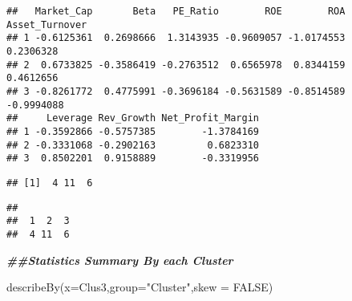 \documentclass[
]{article}
\newenvironment{Shaded}{\begin{snugshade}}{\end{snugshade}}
\newcommand{\AttributeTok}[1]{\textcolor[rgb]{0.77,0.63,0.00}{#1}}
\newcommand{\ConstantTok}[1]{\textcolor[rgb]{0.00,0.00,0.00}{#1}}
\newcommand{\DocumentationTok}[1]{\textcolor[rgb]{0.56,0.35,0.01}{\textbf{\textit{#1}}}}
\newcommand{\FunctionTok}[1]{\textcolor[rgb]{0.00,0.00,0.00}{#1}}
\newcommand{\NormalTok}[1]{#1}
\newcommand{\SpecialCharTok}[1]{\textcolor[rgb]{0.00,0.00,0.00}{#1}}
\newcommand{\StringTok}[1]{\textcolor[rgb]{0.31,0.60,0.02}{#1}}
\begin{document}
\begin{Shaded}
\end{Shaded}

\begin{verbatim}
##   Market_Cap       Beta   PE_Ratio        ROE        ROA Asset_Turnover
## 1 -0.6125361  0.2698666  1.3143935 -0.9609057 -1.0174553      0.2306328
## 2  0.6733825 -0.3586419 -0.2763512  0.6565978  0.8344159      0.4612656
## 3 -0.8261772  0.4775991 -0.3696184 -0.5631589 -0.8514589     -0.9994088
##     Leverage Rev_Growth Net_Profit_Margin
## 1 -0.3592866 -0.5757385        -1.3784169
## 2 -0.3331068 -0.2902163         0.6823310
## 3  0.8502201  0.9158889        -0.3319956
\end{verbatim}

\begin{Shaded}
\end{Shaded}

\begin{verbatim}
## [1]  4 11  6
\end{verbatim}

\begin{Shaded}
\end{Shaded}

\begin{verbatim}
## 
##  1  2  3 
##  4 11  6
\end{verbatim}

\begin{Shaded}
\begin{Highlighting}[]
\DocumentationTok{\#\#Statistics Summary By each Cluster}

\FunctionTok{describeBy}\NormalTok{(}\AttributeTok{x=}\NormalTok{Clus3,}\AttributeTok{group=}\StringTok{"Cluster"}\NormalTok{,}\AttributeTok{skew =} \ConstantTok{FALSE}\NormalTok{)}
\end{Highlighting}
\end{Shaded}
\end{document}
